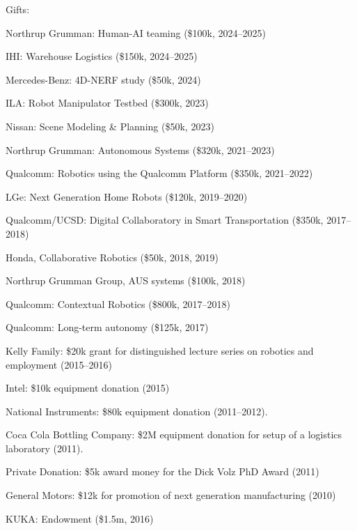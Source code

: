 \documentclass{article}
\begin{document}
\begin{cv}
\begin{cvlist}{Gifts:}
  \item Northrup Grumman: Human-AI teaming (\$100k, 2024--2025)
  \item IHI: Warehouse Logistics (\$150k, 2024--2025)
  \item Mercedes-Benz: 4D-NERF study (\$50k, 2024)  
  \item ILA: Robot Manipulator Testbed (\$300k, 2023)
\item Nissan: Scene Modeling \& Planning (\$50k, 2023)
\item Northrup Grumman: Autonomous Systems (\$320k, 2021--2023)
\item Qualcomm: Robotics using the Qualcomm Platform (\$350k, 2021--2022)
\item LGe: Next Generation Home Robots (\$120k, 2019--2020)
\item Qualcomm/UCSD: Digital Collaboratory in Smart Transportation
  (\$350k, 2017--2018)
\item Honda, Collaborative Robotics (\$50k, 2018, 2019)
\item Northrup Grumman Group, AUS systems (\$100k, 2018)
\item Qualcomm: Contextual Robotics (\$800k, 2017--2018)
\item Qualcomm: Long-term autonomy (\$125k, 2017)
\item Kelly Family: \$20k grant for distinguished lecture series on
  robotics and employment (2015--2016)
\item Intel: \$10k equipment donation (2015)
\item National Instruments: \$80k equipment donation (2011--2012).
\item Coca Cola Bottling Company: \$2M equipment donation for setup of
  a logistics laboratory (2011).
\item Private Donation: \$5k award money for the Dick Volz PhD Award
  (2011)
\item General Motors: \$12k for promotion of next generation
  manufacturing (2010)
\item KUKA: Endowment (\$1.5m, 2016)
\end{cvlist}


\end{cv}
\end{document}
